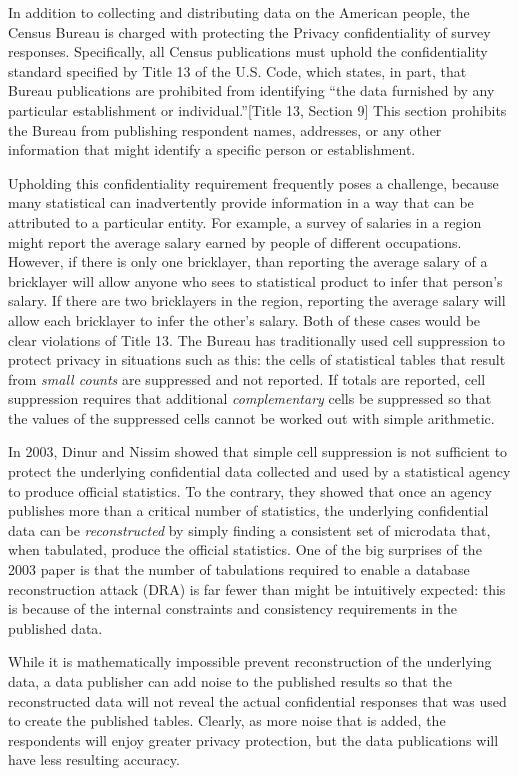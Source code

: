 \documentclass[runningheads]{llncs}
\begin{document}
In addition to collecting and distributing data on the American
people, the Census Bureau is charged with protecting the Privacy confidentiality of
survey responses. Specifically, all Census publications must uphold the
confidentiality standard specified by Title 13 of the U.S. Code, which
states, in part, that Bureau publications are prohibited from
identifying ``the data furnished by any particular
establishment or individual.''[Title 13, Section 9] This section
prohibits the Bureau from publishing respondent names, addresses, or any other
information that might identify a specific person or establishment.

Upholding this confidentiality requirement frequently poses a
challenge, because many statistical can inadvertently provide
information in a way that can be attributed to a particular
entity. For example, a survey of salaries in a region might report the
average salary earned by people of different occupations. However, if
there is only one bricklayer, than reporting the average salary of a
bricklayer will allow anyone who sees to statistical product to infer
that person's salary. If there are two bricklayers in the region,
reporting the average salary will allow each bricklayer to infer the
other's salary. Both of these cases would be clear violations of Title
13. The Bureau has traditionally used cell suppression to protect
privacy in situations such as this: the cells of statistical tables
that result from \emph{small counts} are suppressed and not
reported. If totals are reported, cell suppression requires that
additional \emph{complementary} cells be suppressed so that the values
of the suppressed cells cannot be worked out with simple arithmetic. 

In 2003, Dinur and Nissim showed that simple cell
suppression is not sufficient to protect the underlying confidential
data collected and used by a statistical agency to produce official
statistics\cite{DinurNissim2003}. To the contrary, they showed that
once an agency publishes more than a critical number of statistics,
the underlying confidential data can be \emph{reconstructed} by simply
finding a consistent set of microdata that, when tabulated, produce
the official statistics. One of the big surprises of the 2003 paper is
that the number of tabulations required to enable a database reconstruction
attack (DRA) is far fewer than might be intuitively expected: this is
because of the internal constraints and consistency requirements
in the published data. 

While it is mathematically impossible prevent reconstruction of the
underlying data, a data publisher can add noise to the published
results so that the reconstructed data will not reveal the actual
confidential responses that was used to create the published
tables. Clearly, as more noise that is added, the respondents will
enjoy greater privacy protection, but the data publications will have
less resulting accuracy. 
\end{document}

